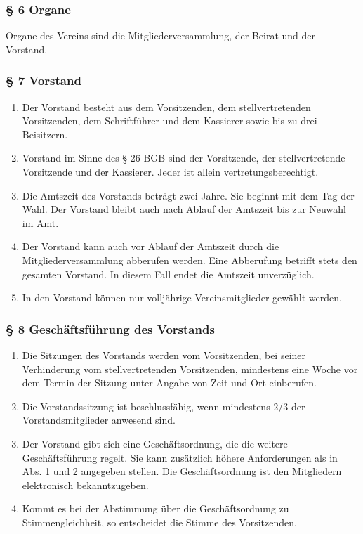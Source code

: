 \documentclass[a4paper,10pt]{article}
\begin{document}
\subsubsection*{§ 6 Organe}
Organe des Vereins sind die Mitgliederversammlung, der Beirat und der Vorstand.

\newpage

\subsubsection*{§ 7 Vorstand}
\begin{enumerate}
  \item Der Vorstand besteht aus dem Vorsitzenden, dem stellvertretenden Vorsitzenden,
dem Schriftführer und dem Kassierer sowie bis zu drei Beisitzern.
\item Vorstand im Sinne des § 26 BGB sind der Vorsitzende, der stellvertretende
Vorsitzende und der Kassierer. Jeder ist allein vertretungsberechtigt.
\item Die Amtszeit des Vorstands beträgt zwei Jahre. Sie beginnt mit dem Tag der Wahl.
Der Vorstand bleibt auch nach Ablauf der Amtszeit bis zur Neuwahl im Amt.
\item Der Vorstand kann auch vor Ablauf der Amtszeit durch die Mitgliederversammlung
abberufen werden. Eine Abberufung betrifft stets den gesamten Vorstand. In
diesem Fall endet die Amtszeit unverzüglich.
\item In den Vorstand können nur volljährige Vereinsmitglieder gewählt werden.
\end{enumerate}


\subsubsection*{§ 8 Geschäftsführung des Vorstands}
\begin{enumerate}
  \item Die Sitzungen des Vorstands werden vom Vorsitzenden, bei seiner Verhinderung vom
stellvertretenden Vorsitzenden, mindestens eine Woche vor dem Termin der Sitzung
unter Angabe von Zeit und Ort einberufen.
\item Die Vorstandssitzung ist beschlussfähig, wenn mindestens 2/3 der
Vorstandsmitglieder anwesend sind.
\item Der Vorstand gibt sich eine Geschäftsordnung, die die weitere Geschäftsführung
regelt. Sie kann zusätzlich höhere Anforderungen als in Abs. 1 und 2 angegeben
stellen. Die Geschäftsordnung ist den Mitgliedern elektronisch bekanntzugeben.
\item Kommt es bei der Abstimmung über die Geschäftsordnung zu Stimmengleichheit, so
entscheidet die Stimme des Vorsitzenden.
\end{enumerate}
\end{document}
